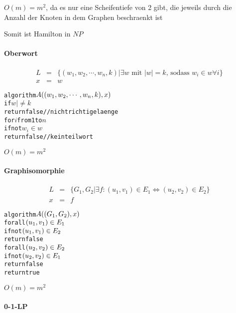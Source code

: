 $O(m) = m^2$, da es nur eine Scheifentiefe von 2 gibt,
die jeweils durch die Anzahl der Knoten in dem Graphen beschraenkt ist

Somit ist Hamilton in $NP$

\paragraph{Oberwort}
\begin{eqnarray}
L &=& \{(w_1,w_2,\cdots,w_n,k) | \text{$\exists w$ mit $|w|=k$, sodass $w_i \in w \forall i$} \} \\
x &=& w
\end{eqnarray}

\begin{alltt}
algorithm \(A((w\sb{1},w\sb{2},\cdots,w\sb{n},k),x)\)
    if \(w| \neq k\)
      return false // nicht richtige laenge
    for \(i\) from 1 to \(n\)
      if not \(w_i \in w\)
        return false // kein teilwort
\end{alltt}

$O(m) = m^2$

\paragraph{Graphisomorphie}
\begin{eqnarray}
L &=& \{G_1,G_2 | \text{$\exists f: (u_1,v_1) \in E_1 \Leftrightarrow (u_2,v_2) \in E_2$} \} \\
x &=& f
\end{eqnarray}

\begin{alltt}
algorithm \(A((G\sb1,G\sb2),x)\)
    forall \( (u\sb1,v\sb1) \in E\sb1\)
      if not \((u\sb1,v\sb1) \in E\sb2\)
        return false
    forall \( (u\sb2,v\sb2) \in E\sb2\)
      if not \((u\sb2,v\sb2) \in E\sb1\)
        return false
    return true
\end{alltt}

$O(m) = m^2$

\paragraph{0-1-LP}



